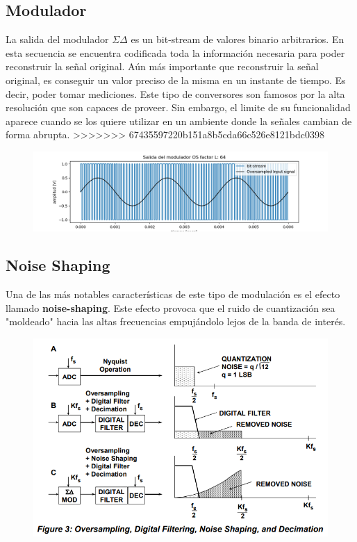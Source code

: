 \subsection{Modulador}
La salida del modulador $\Sigma\Delta$ es un bit-stream de valores binario arbitrarios. En esta secuencia se encuentra codificada toda la información necesaria para poder reconstruir la señal original. Aún más importante que reconstruir la señal original, es conseguir un valor preciso de la misma en un instante de tiempo. Es decir, poder tomar mediciones. Este tipo de conversores son famosos por la alta resolución que son capaces de proveer. Sin embargo, el limite de su funcionalidad aparece cuando se los quiere utilizar en un ambiente donde la señales cambian de forma abrupta.
>>>>>>> 67435597220b151a8b5cda66c526e8121bdc0398

\begin{figure}[H]
	\centering
	\includegraphics[width=0.7\linewidth]{ImagenesEjercicio2/BitsStream64}
	\caption{}
	\label{fig:bitsstream64}
\end{figure}


\subsection{Noise Shaping}
Una de las más notables características de este tipo de modulación es el efecto llamado \textbf{noise-shaping}. Este efecto provoca que el ruido de cuantización sea "moldeado" hacia las altas frecuencias empujándolo lejos de la banda de interés.


\begin{figure}[H]
	\centering
	\includegraphics[width=0.7\linewidth]{ImagenesEjercicio2/NoiseShappingAN}
	\caption{}
	\label{fig:noiseshappingan}
\end{figure}


